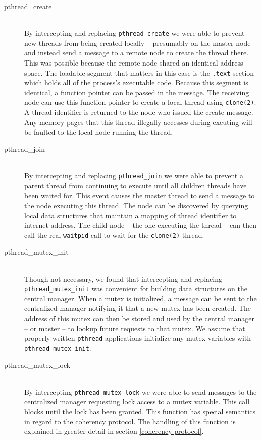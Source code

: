 \begin{description}
\item[pthread\_create] \hfill \\
By intercepting and replacing \verb,pthread_create, we were able to prevent new threads from being created locally -- presumably on the master node -- and instead send a message to a remote node to create the thread there.  This was possible because the remote node shared an identical address space.  The loadable segment that matters in this case is the \verb,.text, section which holds all of the process's executable code.  Because this segment is identical, a function pointer can be passed in the message.  The receiving node can use this function pointer to create a local thread using \verb,clone(2),.  A thread identifier is returned to the node who issued the create message.  Any memory pages that this thread illegally accesses during exeuting will be faulted to the local node running the thread.

\item[pthread\_join] \hfill \\
By intercepting and replacing \verb,pthread_join, we were able to prevent a parent thread from continuing to execute until all children threads have been waited for.  This event causes the master thread to send a message to the node executing this thread.  The node can be discovered by querying local data structures that maintain a mapping of thread identifier to internet address.  The child node -- the one executing the thread -- can then call the real \verb,waitpid, call to wait for the \verb,clone(2), thread.

\item[pthread\_mutex\_init] \hfill \\
Though not necessary, we found that intercepting and replacing \verb,pthread_mutex_init, was convenient for building data structures on the central manager.  When a mutex is initialized, a message can be sent to the centralized manager notifying it that a new mutex has been created.  The address of this mutex can then be stored and used by the central manager -- or master -- to lookup future requests to that mutex.  We assume that properly written \verb,pthread, applications initialize any mutex variables with \verb,pthread_mutex_init,.

\item[pthread\_mutex\_lock] \hfill \\
By intercepting \verb,pthread_mutex_lock, we were able to send messages to the centralized manager requesting lock access to a mutex variable.  This call blocks until the lock has been granted.  This function has special semantics in regard to the coherency protocol.  The handling of this function is explained in greater detail in section \ref{coherency-protocol}.


\end{description}
